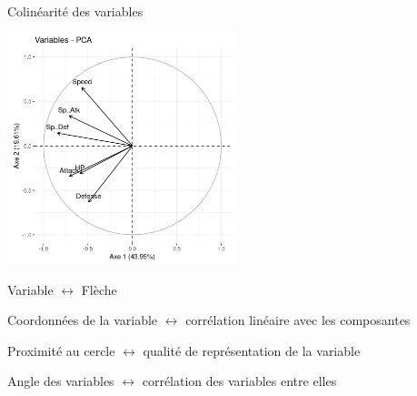 \documentclass{beamer}
\begin{document}
\begin{frame}{Colinéarité des variables}

\begin{center}
\includegraphics[width=0.5\textwidth,keepaspectratio]{img/cercle_trigo_ACP_var.png}
\end{center}

\begin{spacing}{0.7}
Variable $\leftrightarrow$  Flèche 

Coordonnées de la variable $\leftrightarrow$ \alert{corrélation linéaire}  avec les composantes

Proximité au cercle $\leftrightarrow$ qualité de \alert{représentation} de la variable

Angle des variables $\leftrightarrow$ corrélation des variables entre elles
\end{spacing}



\end{frame}
\end{document}
